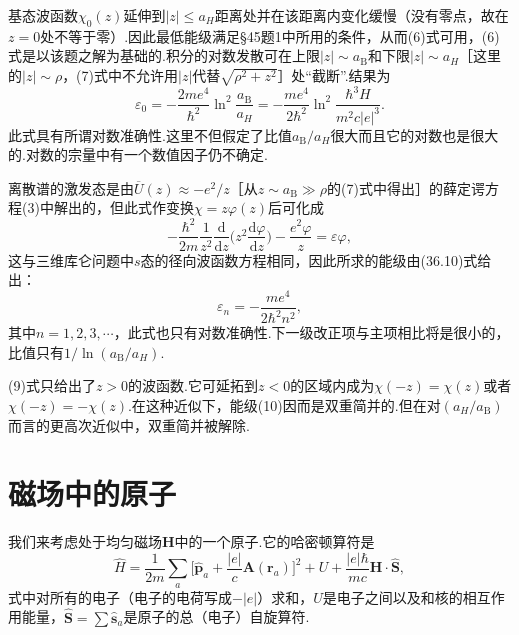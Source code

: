 \begin{xiti}
基态波函数$\chi_0(z)$延伸到$|z|\leqslant a_H$距离处并在该距离内变化缓慢（没有零点，故在$z=0$处不等于零）.因此最低能级满足§45题1中所用的条件，从而(6)式可用，(6)式是以该题之解为基础的.积分的对数发散可在上限$|z|\sim a_\mathrm{B}$和下限$|z|\sim a_H$［这里的$|z|\sim\rho$，(7)式中不允许用$|z|$代替$\sqrt{\rho^2+z^2}$］处“截断”.结果为
\begin{equation}
  \varepsilon_0=-\frac{2me^4}{\hbar^2}\ln^2\frac{a_\mathrm{B}}{a_H}
  =-\frac{me^4}{2\hbar^2}\ln^2\frac{\hbar^3H}{m^2c|e|^3}.
\end{equation}
此式具有所谓对数准确性.这里不但假定了比值$a_\mathrm{B}/a_H$很大而且它的对数也是很大的.对数的宗量中有一个数值因子仍不确定.

离散谱的激发态是由$\overline{U}(z)\approx-e^2/z$［从$z\sim a_\mathrm{B}\gg\rho$的(7)式中得出］的薛定谔方程(3)中解出的，但此式作变换$\chi=z\varphi(z)$后可化成
\begin{equation}
  -\frac{\hbar^2}{2m}\frac{1}{z^2}\frac{\mathrm{d}}{\mathrm{d}z}
  \biggl(z^2\frac{\mathrm{d}\varphi}{\mathrm{d}z}\biggr)-\frac{e^2\varphi}{z}
  =\varepsilon\varphi,
\end{equation}
这与三维库仑问题中$s$态的径向波函数方程相同，因此所求的能级由(36.10)式给出：
\begin{equation}
  \varepsilon_n=-\frac{me^4}{2\hbar^2n^2},
\end{equation}
其中$n=1,2,3,\cdots$，此式也只有对数准确性.下一级改正项与主项相比将是很小的，比值只有$1/\ln(a_\mathrm{B}/a_H)$.

(9)式只给出了$z>0$的波函数.它可延拓到$z<0$的区域内成为$\chi(-z)=\chi(z)$或者$\chi(-z)=-\chi(z)$.在这种近似下，能级(10)因而是双重简并的.但在对$(a_H/a_\mathrm{B})$而言的更高次近似中，双重简并被解除.

\end{xiti}
\renewcommand{\theequation}{\arabic{section}.\arabic{equation}}%

\section{磁场中的原子}

我们来考虑处于均匀磁场$\boldsymbol{H}$中的一个原子.它的哈密顿算符是
\begin{equation}
  \hat{H}=\frac{1}{2m}\sum_a\biggl[\hat{\boldsymbol{p}}_a
  +\frac{|e|}{c}\boldsymbol{A}(\boldsymbol{r}_a)\biggr]^2+U
  +\frac{|e|\hbar}{mc}\boldsymbol{H}\cdot\hat{\boldsymbol{S}},
\end{equation}
式中对所有的电子（电子的电荷写成$-|e|$）求和，$U$是电子之间以及和核的相互作用能量，$\hat{\boldsymbol{S}}=\sum\hat{\boldsymbol{s}}_a$是原子的总（电子）自旋算符.

